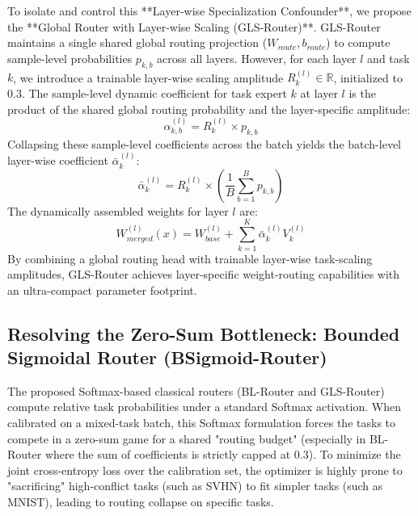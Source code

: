To isolate and control this **Layer-wise Specialization Confounder**, we propose the **Global Router with Layer-wise Scaling (GLS-Router)**. GLS-Router maintains a single shared global routing projection ($W_{route}, b_{route}$) to compute sample-level probabilities $p_{k, b}$ across all layers. However, for each layer $l$ and task $k$, we introduce a trainable layer-wise scaling amplitude $R_k^{(l)} \in \mathbb{R}$, initialized to $0.3$. 
The sample-level dynamic coefficient for task expert $k$ at layer $l$ is the product of the shared global routing probability and the layer-specific amplitude:
\begin{equation}
    \alpha_{k, b}^{(l)} = R_k^{(l)} \times p_{k, b}
\end{equation}
Collapsing these sample-level coefficients across the batch yields the batch-level layer-wise coefficient $\bar{\alpha}_k^{(l)}$:
\begin{equation}
    \bar{\alpha}_k^{(l)} = R_k^{(l)} \times \left( \frac{1}{B} \sum_{b=1}^B p_{k, b} \right)
\end{equation}
The dynamically assembled weights for layer $l$ are:
\begin{equation}
    W_{merged}^{(l)}(x) = W_{base}^{(l)} + \sum_{k=1}^K \bar{\alpha}_k^{(l)} V_k^{(l)}
\end{equation}
By combining a global routing head with trainable layer-wise task-scaling amplitudes, GLS-Router achieves layer-specific weight-routing capabilities with an ultra-compact parameter footprint.

\subsection{Resolving the Zero-Sum Bottleneck: Bounded Sigmoidal Router (BSigmoid-Router)}
The proposed Softmax-based classical routers (BL-Router and GLS-Router) compute relative task probabilities under a standard Softmax activation. When calibrated on a mixed-task batch, this Softmax formulation forces the tasks to compete in a zero-sum game for a shared "routing budget" (especially in BL-Router where the sum of coefficients is strictly capped at $0.3$). To minimize the joint cross-entropy loss over the calibration set, the optimizer is highly prone to "sacrificing" high-conflict tasks (such as SVHN) to fit simpler tasks (such as MNIST), leading to routing collapse on specific tasks.

